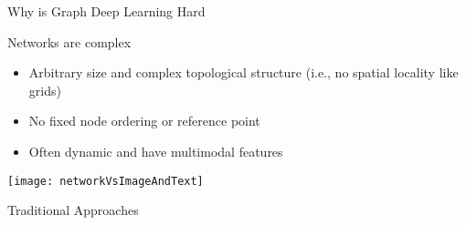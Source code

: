 \begin{frame}[t]{Why is Graph Deep Learning Hard} \vspace{4pt}
    \begin{block}{Networks are complex}
        \begin{itemize}
            \item Arbitrary size and complex topological structure (i.e., no spatial locality like grids)
            \item No fixed node ordering or reference point
            \item Often dynamic and have multimodal features
        \end{itemize}
    \end{block}

    \texttt{[image: networkVsImageAndText]}
\end{frame}

\begin{frame}[t]{Traditional Approaches} \vspace{4pt}


\end{frame}

